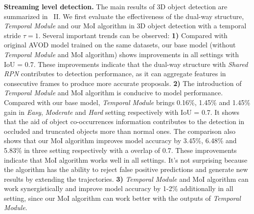 \documentclass[letterpaper, 10pt, conference]{ieeeconf}  %
\begin{document}
\textbf{Streaming level detection.} The main results of 3D object detection are summarized in \tablename \, II. We first evaluate the effectiveness of the dual-way structure, \textit{Temporal Module} and our MoI algorithm in 3D object detection with a temporal stride $\tau = 1$. Several important trends can be observed: \textbf{1)} Compared with original AVOD \cite{ku2018joint} model trained on the same datasets, our base model (without \textit{Temporal Module} and MoI algorithm) shows improvements in all settings with IoU = 0.7. These improvements indicate that the dual-way structure with \textit{Shared RPN} contributes to detection performance, as it can aggregate features in consecutive frames to produce more accurate proposals. \textbf{2)} The introduction of \textit{Temporal Module} and MoI algorithm is conducive to model performance. Compared with our base model, \textit{Temporal Module} brings 0.16\%, 1.45\% and 1.45\% gain in \textit{Easy}, \textit{Moderate} and \textit{Hard} setting respectively with IoU = 0.7. It shows that the aid of object co-occurrences information contributes to the detection in occluded and truncated objects more than normal ones. The comparison also shows that our MoI algorithm improves model accuracy by 3.45\%, 6.48\% and 5.83\% in three setting respectively with a overlap of 0.7. These improvements indicate that MoI algorithm works well in all settings. It's not surprising because the algorithm has the ability to reject false positive predictions and generate new results by extending the trajectories. \textbf{3)} \textit{Temporal Module} and MoI algorithm can work synergistically and improve model accuracy by 1-2\% additionally in all setting, since our MoI algorithm can work better with the outputs of \textit{Temporal Module}. 
\end{document}
